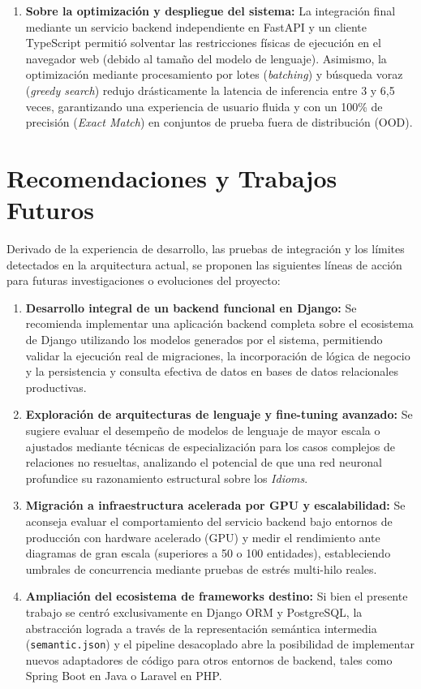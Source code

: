 \begin{enumerate}
    \item \textbf{Sobre la optimización y despliegue del sistema:} La integración final mediante un servicio backend independiente en FastAPI y un cliente TypeScript permitió solventar las restricciones físicas de ejecución en el navegador web (debido al tamaño del modelo de lenguaje). Asimismo, la optimización mediante procesamiento por lotes (\textit{batching}) y búsqueda voraz (\textit{greedy search}) redujo drásticamente la latencia de inferencia entre 3 y 6,5 veces, garantizando una experiencia de usuario fluida y con un 100\% de precisión (\textit{Exact Match}) en conjuntos de prueba fuera de distribución (OOD).
\end{enumerate}

\section{Recomendaciones y Trabajos Futuros}
\label{sec:recomendaciones}

Derivado de la experiencia de desarrollo, las pruebas de integración y los límites detectados en la arquitectura actual, se proponen las siguientes líneas de acción para futuras investigaciones o evoluciones del proyecto:

\begin{enumerate}
    \item \textbf{Desarrollo integral de un backend funcional en Django:} Se recomienda implementar una aplicación backend completa sobre el ecosistema de Django utilizando los modelos generados por el sistema, permitiendo validar la ejecución real de migraciones, la incorporación de lógica de negocio y la persistencia y consulta efectiva de datos en bases de datos relacionales productivas.
    
    \item \textbf{Exploración de arquitecturas de lenguaje y fine-tuning avanzado:} Se sugiere evaluar el desempeño de modelos de lenguaje de mayor escala o ajustados mediante técnicas de especialización para los casos complejos de relaciones no resueltas, analizando el potencial de que una red neuronal profundice su razonamiento estructural sobre los \textit{Idioms}.
     
    \item \textbf{Migración a infraestructura acelerada por GPU y escalabilidad:} Se aconseja evaluar el comportamiento del servicio backend bajo entornos de producción con hardware acelerado (GPU) y medir el rendimiento ante diagramas de gran escala (superiores a 50 o 100 entidades), estableciendo umbrales de concurrencia mediante pruebas de estrés multi-hilo reales.
    
    \item \textbf{Ampliación del ecosistema de frameworks destino:} Si bien el presente trabajo se centró exclusivamente en Django ORM y PostgreSQL, la abstracción lograda a través de la representación semántica intermedia (\texttt{semantic.json}) y el pipeline desacoplado abre la posibilidad de implementar nuevos adaptadores de código para otros entornos de backend, tales como  Spring Boot en Java o Laravel en PHP.
\end{enumerate}